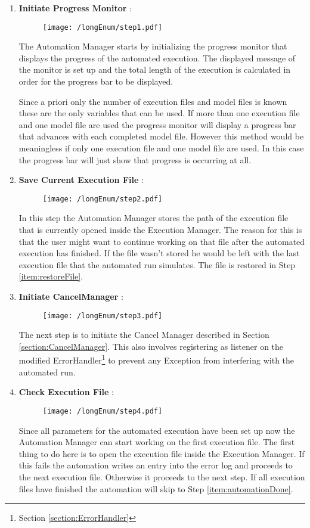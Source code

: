 \begin{enumerate}
 \item \label{item:initiateProgressMonitor} \textbf{Initiate Progress Monitor} :
\begin{figure}[H]
  \centering
  \texttt{[image: /longEnum/step1.pdf]}
\end{figure}
The Automation Manager starts by initializing the 
progress monitor that displays the progress of the automated execution. 
The displayed message of the monitor is set up and the total length of the execution is 
calculated in order for the progress bar to be displayed.

Since a priori only the number of execution files and model files is known these are the only
variables that can be used. If more than one execution file and one model file are used the 
progress monitor will display a progress bar that advances with each completed model file. 
However this method would be meaningless if only one execution file and one model file
are used. In this case the progress bar will just show that progress is occurring at all.

 \item \label{item:saveOpenedFile} \textbf{Save Current Execution File} :
\begin{figure}[H]
  \centering
  \texttt{[image: /longEnum/step2.pdf]}
\end{figure}
In this step the Automation Manager stores the path
of the execution file that is currently opened inside the Execution Manager. The reason for this
is that the user might want to continue working on that file after the automated execution
has finished. If the file wasn't stored he would be left with the last execution file
that the automated run simulates. The file is restored in Step \ref{item:restoreFile}.

 \item \label{item:initiateCancelManager} \textbf{Initiate CancelManager} :
\begin{figure}[H]
  \centering
  \texttt{[image: /longEnum/step3.pdf]}
\end{figure}
The next step is to initiate the Cancel Manager
described in Section \ref{section:CancelManager}. This also involves registering as listener on the 
modified ErrorHandler\footnote{Section \ref{section:ErrorHandler}} to prevent any Exception
from interfering with the automated run.

 \item \label{item:checkExecutionFile} \textbf{Check Execution File} :
\begin{figure}[H]
  \centering
  \texttt{[image: /longEnum/step4.pdf]}
\end{figure}
Since all parameters for the automated execution
have been set up now the Automation Manager can start working on the first execution file. The first
thing to do here is to open the execution file inside the Execution Manager. If this fails the automation
writes an entry into the error log and proceeds to the next execution file. Otherwise it proceeds to the
next step. If all execution files have finished the automation will skip to Step \ref{item:automationDone}.


\end{enumerate}
